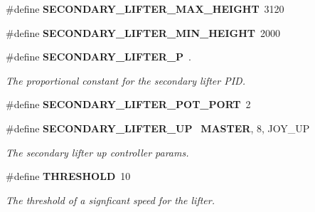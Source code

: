 \begin{DoxyCompactItemize}
\#define \textbf{ S\+E\+C\+O\+N\+D\+A\+R\+Y\+\_\+\+L\+I\+F\+T\+E\+R\+\_\+\+M\+A\+X\+\_\+\+H\+E\+I\+G\+HT}~3120
\item 
\#define \textbf{ S\+E\+C\+O\+N\+D\+A\+R\+Y\+\_\+\+L\+I\+F\+T\+E\+R\+\_\+\+M\+I\+N\+\_\+\+H\+E\+I\+G\+HT}~2000
\item 
\#define \textbf{ S\+E\+C\+O\+N\+D\+A\+R\+Y\+\_\+\+L\+I\+F\+T\+E\+R\+\_\+P}~.
\begin{DoxyCompactList}\small\item\em The proportional constant for the secondary lifter P\+ID. \end{DoxyCompactList}\item 
\#define \textbf{ S\+E\+C\+O\+N\+D\+A\+R\+Y\+\_\+\+L\+I\+F\+T\+E\+R\+\_\+\+P\+O\+T\+\_\+\+P\+O\+RT}~2
\item 
\#define \textbf{ S\+E\+C\+O\+N\+D\+A\+R\+Y\+\_\+\+L\+I\+F\+T\+E\+R\+\_\+\+UP}~\textbf{ M\+A\+S\+T\+ER}, 8, J\+O\+Y\+\_\+\+UP
\begin{DoxyCompactList}\small\item\em The secondary lifter up controller params. \end{DoxyCompactList}\item 
\#define \textbf{ T\+H\+R\+E\+S\+H\+O\+LD}~10
\begin{DoxyCompactList}\small\item\em The threshold of a signficant speed for the lifter. \end{DoxyCompactList}\end{DoxyCompactItemize}
